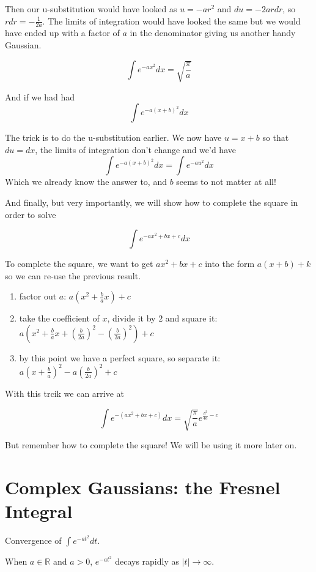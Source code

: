 Then our u-substitution would have looked as $u = -ar^2$
and $du = -2ar dr$, so $r dr = -\frac{1}{2a}$.
The limits of integration would have looked the same but we would have ended up with a factor of $a$
in the denominator giving us another handy Gaussian.

$$
\int e^{-ax^2} dx = \sqrt{ \frac{\pi}{a} }
$$

And if we had had
$$
\int e^{-a\left(x + b\right)^2} dx
$$

The trick is to do the u-substitution earlier.
We now have $u = x+b$ so that $du = dx$, the limits of integration don't change and we'd have
$$
\int e^{-a\left(x + b\right)^2} dx
=
\int e^{-a u^2} dx
$$
Which we already know the answer to, and $b$ seems to not matter at all!

And finally, but very importantly, we will show how to complete the square in order to solve

$$
\int e^{-ax^2 + bx + c} dx
$$

To complete the square, we want to get $ax^2 + bx + c$ into the form $a(x+b) + k$ so we can
re-use the previous result.
\begin{enumerate}
\item factor out $a$: $a \left(x^2 + \frac{b}{a}x \right) + c$
\item take the coefficient of $x$, divide it by $2$ and square it: $a \left(x^2 + \frac{b}{a}x + \left(\frac{b}{2a}\right)^2 - \left(\frac{b}{2a}\right)^2 \right) + c$
\item by this point we have a perfect square, so separate it: $a \left(x + \frac{b}{a} \right)^2 - a\left(\frac{b}{2a}\right)^2 + c$
\end{enumerate}

With this trcik we can arrive at

$$
\int e^{-\left(ax^2 + bx + c\right)} dx = \sqrt{\frac{\pi}{a}} e^{\frac{b^2}{4a} - c}
$$

But remember how to complete the square!
We will be using it more later on.


\section{Complex Gaussians: the Fresnel Integral} \label{integrals:complex-gaussian}


Convergence of $\int e^{-at^2} dt$.

When $a \in \mathbb{R}$ and $a>0$, $e^{-at^2}$ decays rapidly as $|t| \rightarrow \infty$.

